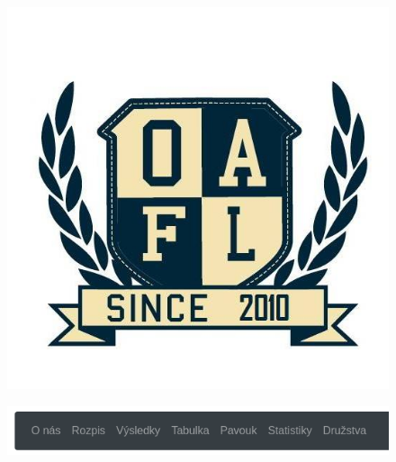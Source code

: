 \documentclass[11pt, a4paper, titlepage]{article}
\begin{document}
\begin{figure}[htp]
\centering
    \begin{minipage}{.5\textwidth}
        \centering
        \includegraphics[width=.60\textwidth]{images/logo.jpg}
        \label{fig:logo}
    \end{minipage}%
    \begin{minipage}{.5\textwidth}
        \centering
        \includegraphics[width=.99\textwidth]{images/menu.png}
         \label{fig:menu}
    \end{minipage}
\end{figure}

\end{document}
